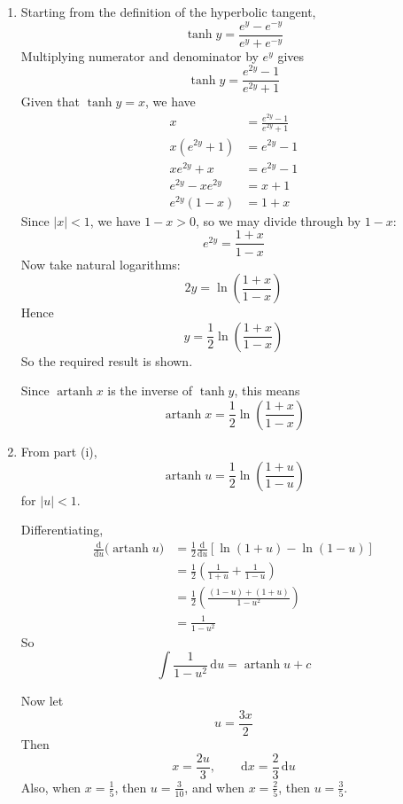 \documentclass[leqno]{article}
\begin{document}
\begin{enumerate}[
  label=\textbf{\arabic*.},
  leftmargin=*,
  topsep=0pt,
  partopsep=0pt,
  parsep=0pt
]
\begin{tcolorbox}[colback=white, colframe=scarlet, title={\textbf{Solution}}, breakable, grow to left by=6mm, grow to right by=10mm]
\begin{enumerate}[label=\textbf{(\roman*)}]
\item Starting from the definition of the hyperbolic tangent,
\[
\tanh y=\frac{e^y-e^{-y}}{e^y+e^{-y}}
\]
Multiplying numerator and denominator by $e^y$ gives
\[
\tanh y=\frac{e^{2y}-1}{e^{2y}+1}
\]
Given that $\tanh y=x$, we have
\begin{align*}
x&=\frac{e^{2y}-1}{e^{2y}+1} \\
x(e^{2y}+1)&=e^{2y}-1 \\
xe^{2y}+x&=e^{2y}-1 \\
e^{2y}-xe^{2y}&=x+1 \\
e^{2y}(1-x)&=1+x
\end{align*}
Since $|x|<1$, we have $1-x>0$, so we may divide through by $1-x$:
\[
e^{2y}=\frac{1+x}{1-x}
\]
Now take natural logarithms:
\[
2y=\ln\left(\frac{1+x}{1-x}\right)
\]
Hence
\[
y=\frac{1}{2}\ln\left(\frac{1+x}{1-x}\right)
\]
So the required result is shown.

Since $\operatorname{artanh}x$ is the inverse of $\tanh y$, this means
\[
\operatorname{artanh}x=\frac{1}{2}\ln\left(\frac{1+x}{1-x}\right)
\]

\item From part (i),
\[
\operatorname{artanh}u=\frac12\ln\left(\frac{1+u}{1-u}\right)
\]
for $|u|<1$.

Differentiating,
\begin{align*}
\frac{\mathrm{d}}{\mathrm{d}u}\bigl(\operatorname{artanh}u\bigr)
&=\frac12\frac{\mathrm{d}}{\mathrm{d}u}\left[\ln(1+u)-\ln(1-u)\right] \\
&=\frac12\left(\frac{1}{1+u}+\frac{1}{1-u}\right) \\
&=\frac12\left(\frac{(1-u)+(1+u)}{1-u^2}\right) \\
&=\frac{1}{1-u^2}
\end{align*}
So
\[
\int \frac{1}{1-u^2}\,\mathrm{d}u=\operatorname{artanh}u+c
\]

Now let
\[
u=\frac{3x}{2}
\]
Then
\[
x=\frac{2u}{3}, \qquad \mathrm{d}x=\frac{2}{3}\,\mathrm{d}u
\]
Also, when $x=\frac15$, then $u=\frac{3}{10}$, and when $x=\frac25$, then $u=\frac35$.


\end{enumerate}
\end{tcolorbox}
\end{enumerate}
\end{document}
